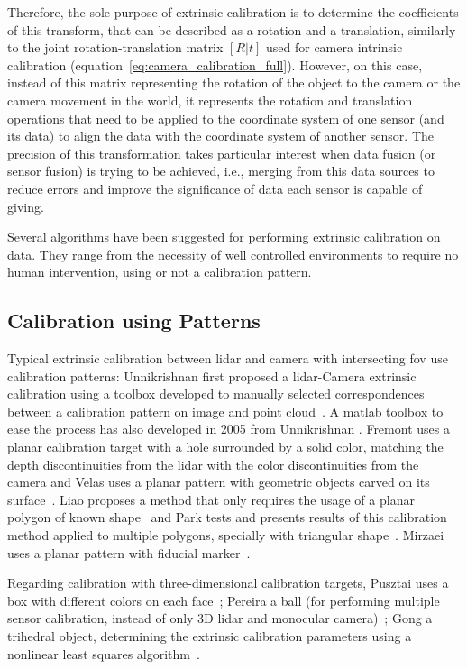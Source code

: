 Therefore, the sole purpose of extrinsic calibration is to determine the coefficients of this transform, that can be described as a rotation and a translation, similarly to the joint rotation-translation matrix $[R|t]$ used for camera intrinsic calibration (equation~\ref{eq:camera_calibration_full}). However, on this case, instead of this matrix representing the rotation of the object to the camera or the camera movement in the world, it represents the rotation and translation operations that need to be applied to the coordinate system of one sensor (and its data) to align the data with the coordinate system of another sensor. The precision of this transformation takes particular interest when data fusion (or sensor fusion) is trying to be achieved, i.e., merging from this data sources to reduce errors and improve the significance of data each sensor is capable of giving. 

Several algorithms have been suggested for performing extrinsic calibration on data. They range from the necessity of well controlled environments to require no human intervention, using or not a calibration pattern. 


\subsection{Calibration using Patterns}
Typical extrinsic calibration between \ac{lidar} and camera with intersecting \ac{fov} use calibration patterns: Unnikrishnan first proposed a \ac{lidar}-Camera extrinsic calibration using a toolbox developed to manually selected correspondences between a calibration pattern on image and point cloud~\cite{Unnikrishnan2005}. A \ac{matlab} toolbox to ease the process has also developed in 2005 from Unnikrishnan \etal. Fremont \etal uses a planar calibration target with a hole surrounded by a solid color, matching the depth discontinuities from the \ac{lidar} with the color discontinuities from the camera \cite{Fremont2013} and Velas uses a planar pattern with geometric objects carved on its surface~\cite{MartinVelas2013}. Liao \etal proposes a method that only requires the usage of a planar polygon of known shape~\cite{Liao2019} and Park \etal tests and presents results of this calibration method applied to multiple polygons, specially with triangular shape~\cite{Park2014}. Mirzaei \etal uses a planar pattern with fiducial marker~\cite{Mirzaei2012}. 

Regarding calibration with three-dimensional calibration targets, Pusztai uses a box with different colors on each face~\cite{Pusztai2018}; Pereira a ball (for performing multiple sensor calibration, instead of only 3D \ac{lidar} and monocular camera)~\cite{Pereira}; Gong a trihedral object, determining the extrinsic calibration parameters using a nonlinear least squares algorithm~\cite{Gong2013}.

